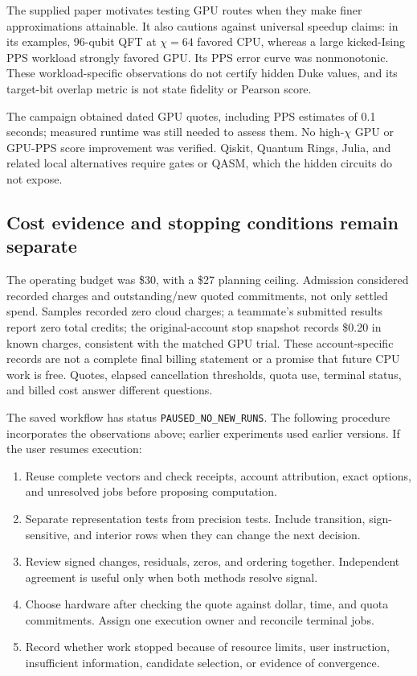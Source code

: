 \documentclass[11pt]{article}
\newcommand{\file}[1]{\nolinkurl{#1}}
\begin{document}
The supplied paper motivates testing GPU routes when they make finer approximations attainable. It also cautions against universal speedup claims: in its examples, 96-qubit QFT at $\chi=64$ favored CPU, whereas a large kicked-Ising PPS workload strongly favored GPU. Its PPS error curve was nonmonotonic. These workload-specific observations do not certify hidden Duke values, and its target-bit overlap metric is not state fidelity or Pearson score.\cite{paper}

The campaign obtained dated GPU quotes, including PPS estimates of 0.1 seconds; measured runtime was still needed to assess them. No high-$\chi$ GPU or GPU-PPS score improvement was verified. Qiskit, Quantum Rings, Julia, and related local alternatives require gates or QASM, which the hidden circuits do not expose.\cite{gpu,decisions}

\subsection{Cost evidence and stopping conditions remain separate}
The operating budget was \$30, with a \$27 planning ceiling. Admission considered recorded charges and outstanding/new quoted commitments, not only settled spend. Samples recorded zero cloud charges; a teammate's submitted results report zero total credits; the original-account stop snapshot records \$0.20 in known charges, consistent with the matched GPU trial. These account-specific records are not a complete final billing statement or a promise that future CPU work is free. Quotes, elapsed cancellation thresholds, quota use, terminal status, and billed cost answer different questions.\cite{ledger,gpu,workflow,stop}

The saved workflow has status \file{PAUSED_NO_NEW_RUNS}. The following procedure incorporates the observations above; earlier experiments used earlier versions. If the user resumes execution:
\begin{enumerate}
\setlength{\itemsep}{2pt}
\item Reuse complete vectors and check receipts, account attribution, exact options, and unresolved jobs before proposing computation.
\item Separate representation tests from precision tests. Include transition, sign-sensitive, and interior rows when they can change the next decision.
\item Review signed changes, residuals, zeros, and ordering together. Independent agreement is useful only when both methods resolve signal.
\item Choose hardware after checking the quote against dollar, time, and quota commitments. Assign one execution owner and reconcile terminal jobs.
\item Record whether work stopped because of resource limits, user instruction, insufficient information, candidate selection, or evidence of convergence.
\end{enumerate}
\end{document}
